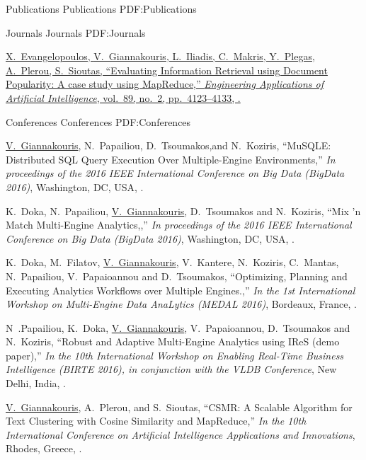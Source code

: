 
\Section
{Publications}
{Publications}
{PDF:Publications}

\SubSection
{Journals}
{Journals}
{PDF:Journals}

\begingroup
\renewcommand{\MaxNumberedItem}{[88]}

\BigGap
\NumberedItem{[1]}
\href{http://www.example.com/my-paper-doi-5}
{X.~Evangelopoulos, \underline{V.~Giannakouris}, L.~Iliadis, C.~Makris, Y.~Plegas, A.~Plerou, S.~Sioutas,
``Evaluating Information Retrieval using Document Popularity: A case
study using MapReduce,''
\textit{Engineering Applications of Artificial Intelligence},
vol.~89,
no.~2,
pp.~4123--4133,
.}

\endgroup

\BigGap
\SubSection
{Conferences}
{Conferences}
{PDF:Conferences}

\begingroup
\renewcommand{\MaxNumberedItem}{[8888]}

\BigGap
\Gap
\NumberedItem{[1]}
{\underline{V.~Giannakouris}, N.~Papailiou, D.~Tsoumakos,and N.~Koziris,
	``MuSQLE: Distributed SQL Query Execution Over Multiple-Engine Environments,'' \textit{In proceedings of the 2016 IEEE International Conference on Big Data (BigData 2016)},
	Washington, DC, USA,
	.}

\NumberedItem{[2]}
{K.~Doka, N.~Papailiou, \underline{V.~Giannakouris}, D.~Tsoumakos and N.~Koziris,
``Mix 'n Match Multi-Engine Analytics,,'' \textit{In proceedings of the 2016 IEEE International Conference on Big Data (BigData 2016)},
Washington, DC, USA,
.}

\NumberedItem{[3]}
{K.~Doka, M.~Filatov, \underline{V.~Giannakouris}, V.~Kantere, N.~Koziris,
	C.~Mantas, N.~Papailiou, V.~Papaioannou and D.~Tsoumakos,
	``Optimizing, Planning and Executing Analytics Workflows over Multiple Engines.,'' \textit{In the 1st International Workshop on Multi-Engine Data AnaLytics (MEDAL 2016)},
	Bordeaux, France,
.}

\NumberedItem{[4]}
{N~.Papailiou, K.~Doka, \underline{V.~Giannakouris}, V.~Papaioannou, D.~Tsoumakos and N.~Koziris,
	``Robust and Adaptive Multi-Engine Analytics using IReS (demo paper),'' \textit{In the 10th International Workshop on Enabling Real-Time Business Intelligence (BIRTE 2016), in conjunction with the VLDB Conference},
	New Delhi, India,
	.}

\NumberedItem{[5]}
{\underline{V.~Giannakouris}, A.~Plerou, and S.~Sioutas, ``CSMR: A Scalable Algorithm for Text Clustering with Cosine Similarity and MapReduce,'' \textit{In the 10th International Conference on Artificial Intelligence Applications and Innovations}, Rhodes, Greece,
.}

\endgroup